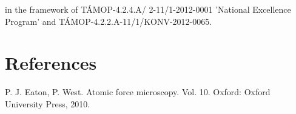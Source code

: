 \documentclass[3p]{elsarticle}
\begin{document}
 in the framework of T\'{A}MOP-4.2.4.A/ 2-11/1-2012-0001 'National Excellence Program' and T\'{A}MOP-4.2.2.A-11/1/KONV-2012-0065.

\section*{References}

\begin{thebibliography}{5}

P. J. Eaton, P. West. Atomic force microscopy. Vol. 10. Oxford: Oxford University Press, 2010.

\end{thebibliography}
\end{document}
